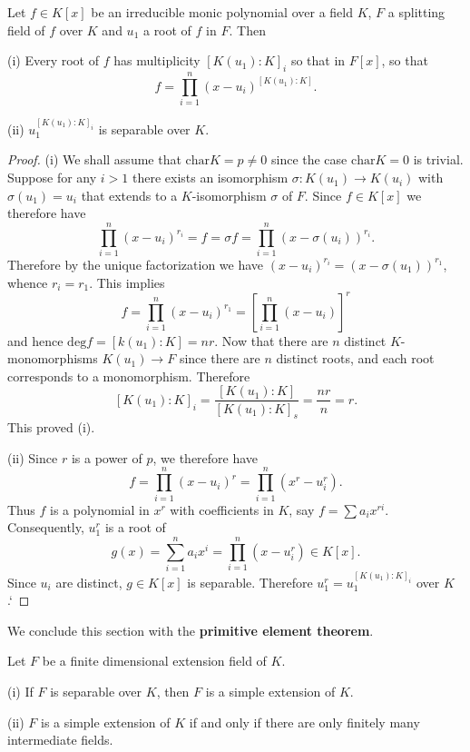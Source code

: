 \begin{corollary}
Let $f\in K[x]$ be an irreducible monic polynomial over a field $K$, $F$ a splitting field of $f$ over $K$ and $u_1$ a root of $f$ in $F$. Then \par
(i) Every root of $f$ has multiplicity $[K(u_1):K]_i$ so that in $F[x]$, so that 
$$
f=\prod_{i=1}^n{\left( x-u_i \right) ^{\left[ K\left( u_1 \right) :K \right]}}.
$$\par
(ii) $u_1^{[K(u_1):K]_i}$ is separable over $K$.
\end{corollary}
\begin{proof}
(i) We shall assume that $\mathrm{char}K=p\ne 0$ since the case $\mathrm{char}K=0$ is trivial. Suppose for any $i>1$ there exists an isomorphism $\sigma:K(u_1)\to K(u_i)$ with $\sigma(u_1)=u_i$ that extends to a $K$-isomorphism $\sigma$ of $F$. Since $f\in K[x]$ we therefore have 
$$
\prod_{i=1}^n{\left( x-u_i \right) ^{r_i}}=f=\sigma f=\prod_{i=1}^n{\left( x-\sigma \left( u_i \right) \right) ^{r_i}}.
$$
Therefore by the unique factorization we have $(x-u_i)^{r_i}=(x-\sigma(u_1))^{r_1}$, whence $r_i=r_1$. This implies 
$$
f=\prod_{i=1}^n{\left( x-u_i \right) ^{r_1}}=\left[ \prod_{i=1}^n{\left( x-u_i \right)} \right] ^r
$$
and hence $\mathrm{deg}f=[k(u_1):K]=nr$. Now that there are $n$ distinct $K$-monomorphisms $K(u_1)\to F$ since there are $n$ distinct roots, and each root corresponds to a monomorphism. Therefore 
$$
\left[ K\left( u_1 \right) :K \right] _i=\frac{\left[ K\left( u_1 \right) :K \right]}{\left[ K\left( u_1 \right) :K \right] _s}=\frac{nr}{n}=r.
$$
This proved (i).\par
(ii) Since $r$ is a power of $p$, we therefore have 
$$
f=\prod_{i=1}^n{\left( x-u_i \right) ^r}=\prod_{i=1}^n{\left( x^r-u_{i}^{r} \right)}.
$$
Thus $f$ is a polynomial in $x^r$ with coefficients in $K$, say $f=\sum a_ix^{ri}$. Consequently, $u_1^r$ is a root of 
$$
g\left( x \right) =\sum_{i=1}^n{a_ix^i}=\prod_{i=1}^n{\left( x-u_{i}^{r} \right)}\in K\left[ x \right] .
$$
Since $u_i$ are distinct, $g\in K[x]$ is separable. Therefore $u_1^r=u_1^{[K(u_1):K]_i}$ over $K$.` 
\end{proof}
We conclude this section with the \textbf{primitive element theorem}.
\begin{proposition}
Let $F$ be a finite dimensional extension field of $K$.\par
(i) If $F$ is separable over $K$, then $F$ is a simple extension of $K$.\par
(ii) $F$ is a simple extension of $K$ if and only if there are only finitely many intermediate fields.
\end{proposition}
